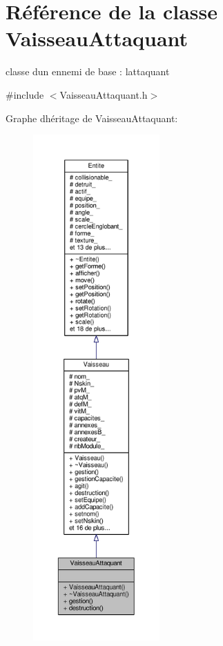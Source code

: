 \hypertarget{class_vaisseau_attaquant}{}\section{Référence de la classe Vaisseau\+Attaquant}
\label{class_vaisseau_attaquant}


classe d\textquotesingle{}un ennemi de base \+: l\textquotesingle{}attaquant  




{\ttfamily \#include $<$Vaisseau\+Attaquant.\+h$>$}



Graphe d\textquotesingle{}héritage de Vaisseau\+Attaquant\+:\nopagebreak
\begin{figure}[H]
\begin{center}
\leavevmode
\includegraphics[height=550pt]{class_vaisseau_attaquant__inherit__graph}
\end{center}
\end{figure}



